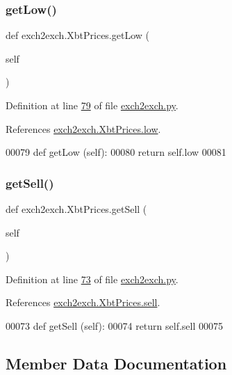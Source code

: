 \subsubsection{\texorpdfstring{get\+Low()}{getLow()}}
{\footnotesize\ttfamily def exch2exch.\+Xbt\+Prices.\+get\+Low (\begin{DoxyParamCaption}\item[{}]{self }\end{DoxyParamCaption})}



Definition at line \hyperlink{exch2exch_8py_source_l00079}{79} of file \hyperlink{exch2exch_8py_source}{exch2exch.\+py}.



References \hyperlink{exch2exch_8py_source_l00062}{exch2exch.\+Xbt\+Prices.\+low}.


\begin{DoxyCode}
00079     \textcolor{keyword}{def }getLow (self):
00080         \textcolor{keywordflow}{return} self.low
00081         
\end{DoxyCode}
\mbox{\label{classexch2exch_1_1_xbt_prices_af9dde8f1bc61fbff30bc4cfa4d8d1f50}} 
\subsubsection{\texorpdfstring{get\+Sell()}{getSell()}}
{\footnotesize\ttfamily def exch2exch.\+Xbt\+Prices.\+get\+Sell (\begin{DoxyParamCaption}\item[{}]{self }\end{DoxyParamCaption})}



Definition at line \hyperlink{exch2exch_8py_source_l00073}{73} of file \hyperlink{exch2exch_8py_source}{exch2exch.\+py}.



References \hyperlink{exch2exch_8py_source_l00058}{exch2exch.\+Xbt\+Prices.\+sell}.


\begin{DoxyCode}
00073     \textcolor{keyword}{def }getSell (self):
00074         \textcolor{keywordflow}{return} self.sell
00075         
\end{DoxyCode}


\subsection{Member Data Documentation}
\mbox{\label{classexch2exch_1_1_xbt_prices_a8f1d8ac0ef114ea3645314578697b7ac}} 
